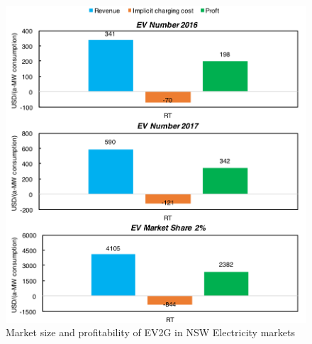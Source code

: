 

\begin{figure}[h!]
	\centering
	\includegraphics[width=0.95\linewidth]{Figures/NSW_EV_profit}
	\caption{Market size and profitability of EV2G in NSW Electricity markets}
	\label{fig:NSW_EV}
\end{figure}


